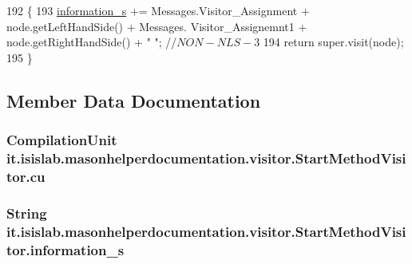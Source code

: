 \begin{DoxyCode}
192                                          \{
193         \hyperlink{classit_1_1isislab_1_1masonhelperdocumentation_1_1visitor_1_1_start_method_visitor_a59b86134adb11f995ce96c1a96b51d50}{information\_s} += Messages.Visitor\_Assignment + node.getLeftHandSide() + Messages.
      Visitor\_Assignemnt1 + node.getRightHandSide() + \textcolor{stringliteral}{" "}; \textcolor{comment}{//$NON-NLS-3$}
194         \textcolor{keywordflow}{return} super.visit(node);
195     \}
\end{DoxyCode}


\subsection{Member Data Documentation}
\hypertarget{classit_1_1isislab_1_1masonhelperdocumentation_1_1visitor_1_1_start_method_visitor_a4111ccaff10a4938df4ff668149e92ad}{
\subsubsection[{cu}]{\setlength{\rightskip}{0pt plus 5cm}Compilation\-Unit it.\-isislab.\-masonhelperdocumentation.\-visitor.\-Start\-Method\-Visitor.\-cu\hspace{0.3cm}{\ttfamily [private]}}}\label{classit_1_1isislab_1_1masonhelperdocumentation_1_1visitor_1_1_start_method_visitor_a4111ccaff10a4938df4ff668149e92ad}
\hypertarget{classit_1_1isislab_1_1masonhelperdocumentation_1_1visitor_1_1_start_method_visitor_a59b86134adb11f995ce96c1a96b51d50}{
\subsubsection[{information\-\_\-s}]{\setlength{\rightskip}{0pt plus 5cm}String it.\-isislab.\-masonhelperdocumentation.\-visitor.\-Start\-Method\-Visitor.\-information\-\_\-s\hspace{0.3cm}{\ttfamily [private]}}}\label{classit_1_1isislab_1_1masonhelperdocumentation_1_1visitor_1_1_start_method_visitor_a59b86134adb11f995ce96c1a96b51d50}
